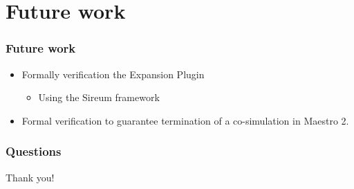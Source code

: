 \documentclass{beamer}
\begin{document}
\section{Future work}

\begin{frame}
\frametitle{Future work}
\begin{itemize}
    \item Formally verification the Expansion Plugin  
    \begin{itemize}
        \item Using the Sireum framework
    \end{itemize}
    \item Formal verification to guarantee termination of a co-simulation in Maestro 2.
\end{itemize}
\end{frame}

\begin{frame}
\frametitle{Questions}
\huge
Thank you!
\end{frame}
\end{document}
